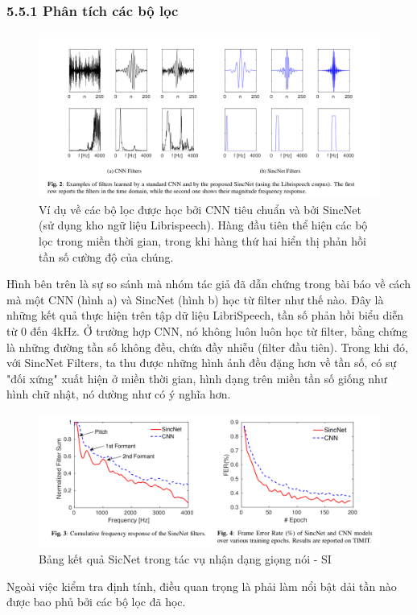 \documentclass{article}
\begin{document}
	\subsubsection{5.5.1 Phân tích các bộ lọc}
	\begin{figure}[H]
		\centering
		\includegraphics[width=1\textwidth]{images/cnn_filters_sincnet_filters.png}
		\caption{Ví dụ về các bộ lọc được học bởi CNN tiêu chuẩn và bởi SincNet (sử dụng kho ngữ liệu Librispeech). Hàng đầu tiên thể hiện các bộ lọc trong miền thời gian, trong khi hàng thứ hai hiển thị phản hồi tần số cường độ của chúng.}
		\label{fig:writing-thesis}
	\end{figure}
	Hình bên trên là sự so sánh mà nhóm tác giả đã dẫn chứng trong bài báo về cách mà một CNN (hình a) và SincNet (hình b) học từ filter như thế nào. Đây là những kết quả thực hiện trên tập dữ liệu LibriSpeech, tần số phản hồi biểu diễn từ 0 đến 4kHz. Ở trường hợp CNN, nó không luôn luôn học từ filter, bằng chứng là những đường tần số không đều, chứa đầy nhiễu (filter đầu tiên). Trong khi đó, với SincNet Filters, ta thu được những hình ảnh đều đặng hơn về tần số, có sự "đối xứng" xuất hiện ở miền thời gian, hình dạng trên miền tần số giống như hình chữ nhật, nó dường như có ý nghĩa hơn.
	
	\begin{figure}[H]
		\centering
		\includegraphics[width=1\textwidth]{images/filter_analysis.png}
		\caption{Bảng kết quả SicNet trong tác vụ nhận dạng giọng nói - SI}
		\label{fig:writing-thesis}
	\end{figure}
	Ngoài việc kiểm tra định tính, điều quan trọng là phải làm nổi bật dải tần nào được bao phủ bởi các bộ lọc đã học. 
	
\end{document}
